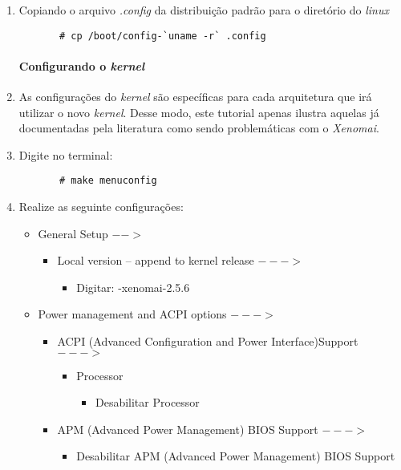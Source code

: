 \documentclass[a4paper,10pt]{article}
\begin{document}
\begin{enumerate}
\begin{enumerate}
	\item Copiando o arquivo \emph{.config} da distribuição padrão para o diretório do \emph{linux}
	  \begin{lstlisting}
	   # cp /boot/config-`uname -r` .config
	  \end{lstlisting}
      
     \paragraph{Configurando o \emph{kernel}}

	\item As configurações do \emph{kernel} são específicas para cada arquitetura que irá utilizar o novo \emph{kernel}. 
	  Desse modo, este tutorial apenas ilustra aquelas já documentadas pela literatura como sendo problemáticas 
	  com o \emph{Xenomai}.
	
	\item Digite no terminal:
	  \begin{lstlisting}
	   # make menuconfig
	  \end{lstlisting}

	\item Realize as seguinte configurações:
	  \begin{itemize}
	    \item General Setup $-->$
		\begin{itemize}
		  \item Local version – append to kernel release $--->$
		    \begin{itemize}
		      \item Digitar: -xenomai-2.5.6
		    \end{itemize}
		\end{itemize}

	      \item Power management and ACPI options $--->$
		\begin{itemize}
		  \item ACPI (Advanced Configuration and Power Interface)Support $--->$
		    \begin{itemize}
		      \item Processor
			\begin{itemize}
			  \item Desabilitar Processor
			\end{itemize}
		    \end{itemize}

		  \item APM (Advanced Power Management) BIOS Support $--->$
		    \begin{itemize}
		      \item Desabilitar APM (Advanced Power Management) BIOS Support
		    \end{itemize}


\end{itemize}
\end{itemize}
\end{enumerate}
\end{enumerate}
\end{document}
